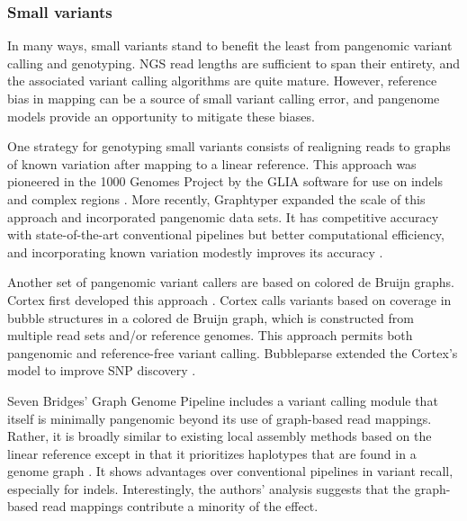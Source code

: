 \subsubsection{Small variants}

In many ways, small variants stand to benefit the least from pangenomic variant calling and genotyping.
NGS read lengths are sufficient to span their entirety, and the associated variant calling algorithms are quite mature.
However, reference bias in mapping can be a source of small variant calling error, and pangenome models provide an opportunity to mitigate these biases.

One strategy for genotyping small variants consists of realigning reads to graphs of known variation after mapping to a linear reference.
This approach was pioneered in the 1000 Genomes Project by the GLIA software for use on indels and complex regions \cite{1000_2015}.
More recently, Graphtyper expanded the scale of this approach and incorporated pangenomic data sets.
It has competitive accuracy with state-of-the-art conventional pipelines but better computational efficiency, and incorporating known variation modestly improves its accuracy \cite{eggertsson2017graphtyper}.

Another set of pangenomic variant callers are based on colored de Bruijn graphs.
Cortex first developed this approach \cite{Iqbal_2012}.
Cortex calls variants based on coverage in bubble structures in a colored de Bruijn graph, which is constructed from multiple read sets and/or reference genomes.
This approach permits both pangenomic and reference-free variant calling.
Bubbleparse extended the Cortex's model to improve SNP discovery \cite{Leggett_2013}.

Seven Bridges' Graph Genome Pipeline includes a variant calling module that itself is minimally pangenomic beyond its use of graph-based read mappings.
Rather, it is broadly similar to existing local assembly methods based on the linear reference \cite{Poplin_2017, Rimmer_2014} except in that it prioritizes haplotypes that are found in a genome graph \cite{Rakocevic_2019}.
It shows advantages over conventional pipelines in variant recall, especially for indels.
Interestingly, the authors' analysis suggests that the graph-based read mappings contribute a minority of the effect.

